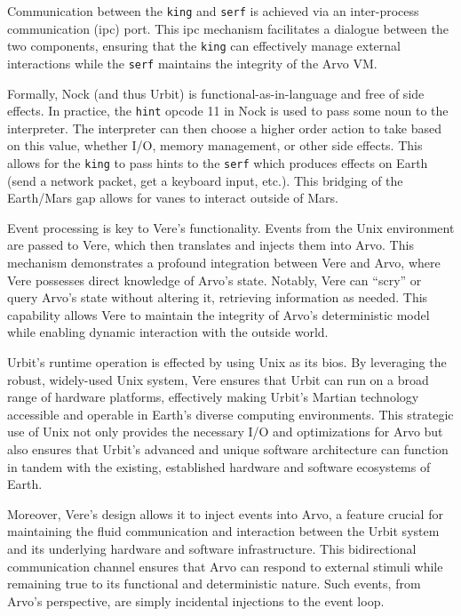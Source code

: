 \documentclass[twoside]{article}
\begin{document}
Communication between the \texttt{king} and \texttt{serf} is achieved via an inter-process communication ({\sc ipc}) port.  This {\sc ipc} mechanism facilitates a dialogue between the two components, ensuring that the \texttt{king} can effectively manage external interactions while the \texttt{serf} maintains the integrity of the Arvo VM.

Formally, Nock (and thus Urbit) is functional-as-in-language and free of side effects.  In practice, the \texttt{hint} opcode 11 in Nock is used to pass some noun to the interpreter.  The interpreter can then choose a higher order action to take based on this value, whether I/O, memory management, or other side effects.  This allows for the \texttt{king} to pass hints to the \texttt{serf} which produces effects on Earth (send a network packet, get a keyboard input, etc.).  This bridging of the Earth/Mars gap allows for vanes to interact outside of Mars.

Event processing is key to Vere's functionality.  Events from the Unix environment are passed to Vere, which then translates and injects them into Arvo.  This mechanism demonstrates a profound integration between Vere and Arvo, where Vere possesses direct knowledge of Arvo's state.  Notably, Vere can ``scry'' or query Arvo's state without altering it, retrieving information as needed.  This capability allows Vere to maintain the integrity of Arvo's deterministic model while enabling dynamic interaction with the outside world.

Urbit's runtime operation is effected by using Unix as its {\sc bios}.  By leveraging the robust, widely-used Unix system, Vere ensures that Urbit can run on a broad range of hardware platforms, effectively making Urbit's Martian technology accessible and operable in Earth's diverse computing environments.  This strategic use of Unix not only provides the necessary I/O and optimizations for Arvo but also ensures that Urbit's advanced and unique software architecture can function in tandem with the existing, established hardware and software eco\-systems of Earth.

Moreover, Vere's design allows it to inject events into Arvo, a feature crucial for maintaining the fluid communication and interaction between the Urbit system and its underlying hardware and software infrastructure.  This bidirectional communication channel ensures that Arvo can respond to external stimuli while remaining true to its functional and deterministic nature.  Such events, from Arvo's perspective, are simply incidental injections to the event loop.
\end{document}
